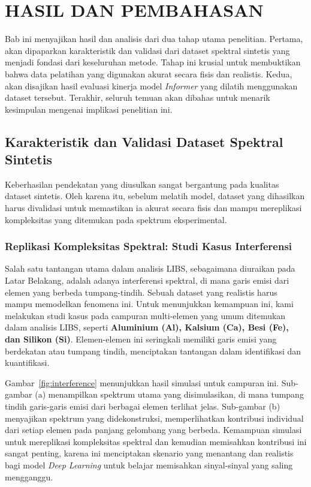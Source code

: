 \chapter{HASIL DAN PEMBAHASAN}

Bab ini menyajikan hasil dan analisis dari dua tahap utama penelitian. Pertama, akan dipaparkan karakteristik dan validasi dari dataset spektral sintetis yang menjadi fondasi dari keseluruhan metode. Tahap ini krusial untuk membuktikan bahwa data pelatihan yang digunakan akurat secara fisis dan realistis. Kedua, akan disajikan hasil evaluasi kinerja model \textit{Informer} yang dilatih menggunakan dataset tersebut. Terakhir, seluruh temuan akan dibahas untuk menarik kesimpulan mengenai implikasi penelitian ini.

\section{Karakteristik dan Validasi Dataset Spektral Sintetis}
\label{sec:validasi_simulasi}
Keberhasilan pendekatan yang diusulkan sangat bergantung pada kualitas dataset sintetis. Oleh karena itu, sebelum melatih model, dataset yang dihasilkan harus divalidasi untuk memastikan ia akurat secara fisis dan mampu mereplikasi kompleksitas yang ditemukan pada spektrum eksperimental.

\subsection{Replikasi Kompleksitas Spektral: Studi Kasus Interferensi}
Salah satu tantangan utama dalam analisis LIBS, sebagaimana diuraikan pada Latar Belakang, adalah adanya interferensi spektral, di mana garis emisi dari elemen yang berbeda tumpang-tindih. Sebuah dataset yang realistis harus mampu memodelkan fenomena ini. Untuk menunjukkan kemampuan ini, kami melakukan studi kasus pada campuran multi-elemen yang umum ditemukan dalam analisis LIBS, seperti \textbf{Aluminium (Al), Kalsium (Ca), Besi (Fe), dan Silikon (Si)}. Elemen-elemen ini seringkali memiliki garis emisi yang berdekatan atau tumpang tindih, menciptakan tantangan dalam identifikasi dan kuantifikasi.

Gambar~\ref{fig:interference} menunjukkan hasil simulasi untuk campuran ini. Sub-gambar (a) menampilkan spektrum utama yang disimulasikan, di mana tumpang tindih garis-garis emisi dari berbagai elemen terlihat jelas. Sub-gambar (b) menyajikan spektrum yang didekonstruksi, memperlihatkan kontribusi individual dari setiap elemen pada panjang gelombang yang berbeda. Kemampuan simulasi untuk mereplikasi kompleksitas spektral dan kemudian memisahkan kontribusi ini sangat penting, karena ini menciptakan skenario yang menantang dan realistis bagi model \textit{Deep Learning} untuk belajar memisahkan sinyal-sinyal yang saling mengganggu.

